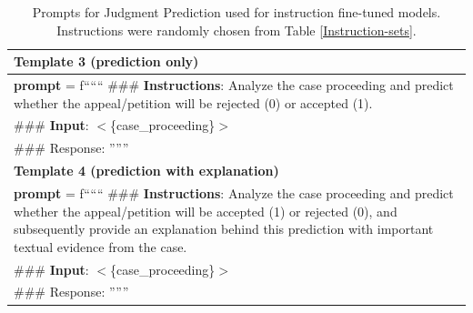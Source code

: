 \begin{table}[h]
    \centering
    \begin{tabular}{|p{}|}
    \hline
    {\bf Template 3 (prediction only)}\\
    \hline
   
{\bf prompt} = f``````
\#\#\# {\bf Instructions}: Analyze the case proceeding and predict whether the appeal/petition will be rejected (0) or accepted (1). \\

\#\#\# \textbf{Input}: $<$\{case\_proceeding\}$>$\\


\#\#\# Response:
  ''''''\\
\hline
    {\bf Template 4 (prediction with explanation)}\\
    \hline
   
{\bf prompt} = f``````
\#\#\# {\bf Instructions}: Analyze the case proceeding and predict whether the appeal/petition will be accepted (1) or rejected (0), and subsequently provide an explanation behind this prediction with important textual evidence from the case. \\

\#\#\# \textbf{Input}: $<$\{case\_proceeding\}$>$\\


\#\#\# Response:
  ''''''\\
\hline


    \end{tabular}
    \caption{Prompts for Judgment Prediction used for instruction fine-tuned models. Instructions were randomly chosen from Table \ref{Instruction-sets}.}
    \label{tab:judgment_prediction_prompts_zero}
\end{table}

